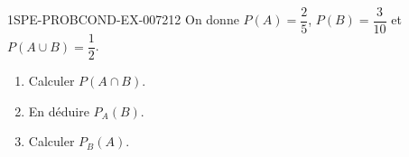 \begin{exercice}{1SPE-PROBCOND-EX-007}{2}{12}
On donne $P(A) = \dfrac{2}{5}$, $P(B) = \dfrac{3}{10}$ et $P(A \cup B) = \dfrac{1}{2}$.

\begin{enumerate}
  \item Calculer $P(A \cap B)$.
  \item En déduire $P_A(B)$.
  \item Calculer $P_B(A)$.
\end{enumerate}
\end{exercice}
